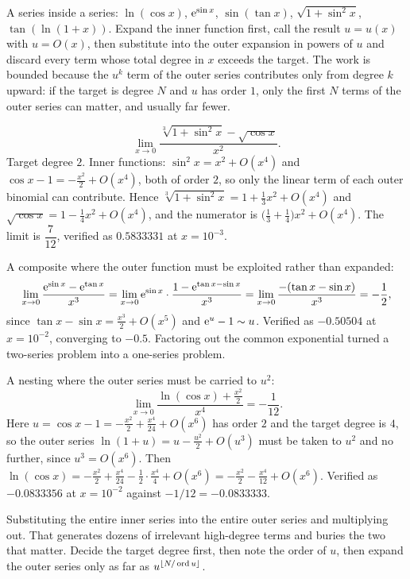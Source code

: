 \cue A series inside a series: $\ln(\cos x)$, $\mathrm{e}^{\sin x}$, $\sin(\tan x)$, $\sqrt{1+\sin^{2}x}$, $\tan(\ln(1+x))$.
\method Expand the inner function first, call the result $u=u(x)$ with $u=O(x)$, then substitute into the outer expansion in powers of $u$ and discard every term whose total degree in $x$ exceeds the target. The work is bounded because the $u^{k}$ term of the outer series contributes only from degree $k$ upward: if the target is degree $N$ and $u$ has order $1$, only the first $N$ terms of the outer series can matter, and usually far fewer.

\begin{worked}
\[
\lim_{x\to0}\frac{\sqrt[3]{1+\sin^{2}x}-\sqrt{\cos x}}{x^{2}}.
\]
Target degree $2$. Inner functions: $\sin^{2}x=x^{2}+O(x^{4})$ and $\cos x-1=-\tfrac{x^{2}}{2}+O(x^{4})$, both of order $2$, so only the linear term of each outer binomial can contribute. Hence $\sqrt[3]{1+\sin^{2}x}=1+\tfrac13x^{2}+O(x^{4})$ and $\sqrt{\cos x}=1-\tfrac14x^{2}+O(x^{4})$, and the numerator is $\bigl(\tfrac13+\tfrac14\bigr)x^{2}+O(x^{4})$. The limit is $\dfrac{7}{12}$, verified as $0.5833331$ at $x=10^{-3}$.

A composite where the outer function must be exploited rather than expanded:
\[
\lim_{x\to0}\frac{\mathrm{e}^{\sin x}-\mathrm{e}^{\tan x}}{x^{3}}
=\lim_{x\to0}\mathrm{e}^{\sin x}\cdot\frac{1-\mathrm{e}^{\tan x-\sin x}}{x^{3}}
=\lim_{x\to0}\frac{-(\tan x-\sin x)}{x^{3}}=-\frac12 ,
\]
since $\tan x-\sin x=\tfrac{x^{3}}{2}+O(x^{5})$ and $\mathrm{e}^{u}-1\sim u$. Verified as $-0.50504$ at $x=10^{-2}$, converging to $-0.5$. Factoring out the common exponential turned a two-series problem into a one-series problem.

A nesting where the outer series must be carried to $u^{2}$:
\[
\lim_{x\to0}\frac{\ln(\cos x)+\tfrac{x^{2}}{2}}{x^{4}}=-\frac1{12}.
\]
Here $u=\cos x-1=-\tfrac{x^{2}}{2}+\tfrac{x^{4}}{24}+O(x^{6})$ has order $2$ and the target degree is $4$, so the outer series $\ln(1+u)=u-\tfrac{u^{2}}{2}+O(u^{3})$ must be taken to $u^{2}$ and no further, since $u^{3}=O(x^{6})$. Then $\ln(\cos x)=-\tfrac{x^{2}}{2}+\tfrac{x^{4}}{24}-\tfrac12\cdot\tfrac{x^{4}}{4}+O(x^{6})=-\tfrac{x^{2}}{2}-\tfrac{x^{4}}{12}+O(x^{6})$. Verified as $-0.0833356$ at $x=10^{-2}$ against $-1/12=-0.0833333$.
\end{worked}

\begin{trap}
Substituting the entire inner series into the entire outer series and multiplying out. That generates dozens of irrelevant high-degree terms and buries the two that matter. Decide the target degree first, then note the order of $u$, then expand the outer series only as far as $u^{\lfloor N/\operatorname{ord} u\rfloor}$.
\end{trap}

